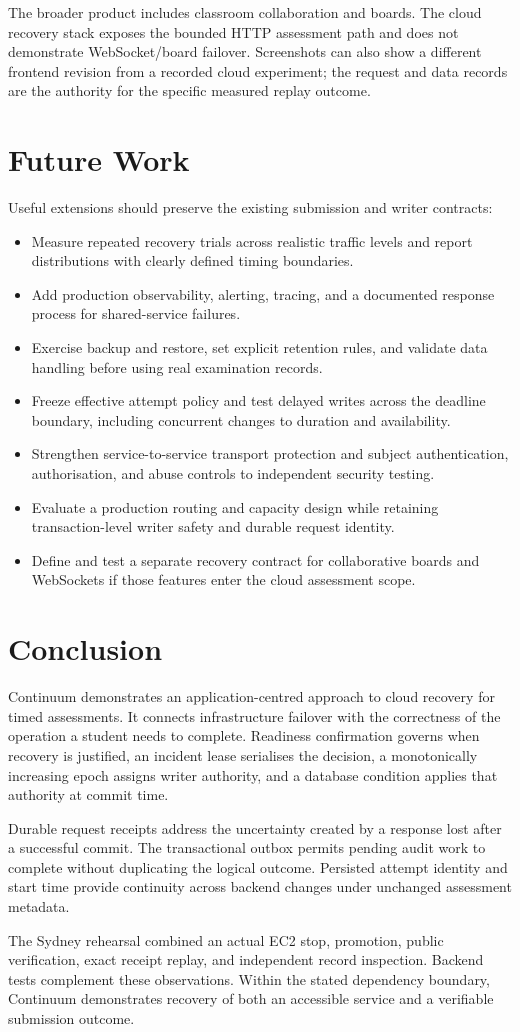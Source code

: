 The broader product includes classroom collaboration and boards. The cloud recovery stack exposes the bounded HTTP assessment path and does not demonstrate WebSocket/board failover. Screenshots can also show a different frontend revision from a recorded cloud experiment; the request and data records are the authority for the specific measured replay outcome.
\section{Future Work}
Useful extensions should preserve the existing submission and writer contracts:
\begin{itemize}
\item Measure repeated recovery trials across realistic traffic levels and report distributions with clearly defined timing boundaries.
\item Add production observability, alerting, tracing, and a documented response process for shared-service failures.
\item Exercise backup and restore, set explicit retention rules, and validate data handling before using real examination records.
\item Freeze effective attempt policy and test delayed writes across the deadline boundary, including concurrent changes to duration and availability.
\item Strengthen service-to-service transport protection and subject authentication, authorisation, and abuse controls to independent security testing.
\item Evaluate a production routing and capacity design while retaining transaction-level writer safety and durable request identity.
\item Define and test a separate recovery contract for collaborative boards and WebSockets if those features enter the cloud assessment scope.
\end{itemize}
\section{Conclusion}
Continuum demonstrates an application-centred approach to cloud recovery for timed assessments. It connects infrastructure failover with the correctness of the operation a student needs to complete. Readiness confirmation governs when recovery is justified, an incident lease serialises the decision, a monotonically increasing epoch assigns writer authority, and a database condition applies that authority at commit time.

Durable request receipts address the uncertainty created by a response lost after a successful commit. The transactional outbox permits pending audit work to complete without duplicating the logical outcome. Persisted attempt identity and start time provide continuity across backend changes under unchanged assessment metadata.

The Sydney rehearsal combined an actual EC2 stop, promotion, public verification, exact receipt replay, and independent record inspection. Backend tests complement these observations. Within the stated dependency boundary, Continuum demonstrates recovery of both an accessible service and a verifiable submission outcome.
